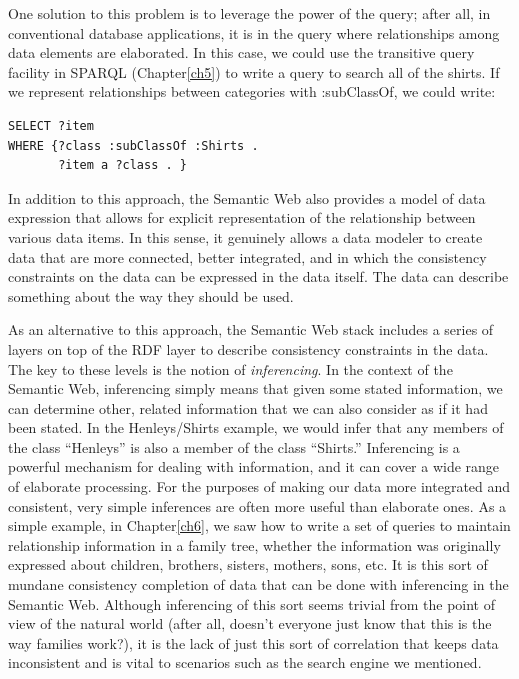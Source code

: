 One solution to this problem is to leverage the power of the query;
after all, in conventional database applications, it is in the query
where relationships among data elements are elaborated. In this case, we
could use the transitive query facility in SPARQL (Chapter\ref{ch5}) to write a
query to search all of the shirts. If we represent relationships between
categories with :subClassOf, we could write:

\begin{lstlisting}
SELECT ?item
WHERE {?class :subClassOf :Shirts .
       ?item a ?class . }
\end{lstlisting}


In addition to this approach, the Semantic Web also provides a model of
data expression that allows for explicit representation of the
relationship between various data items. In this sense, it genuinely
allows a data modeler to create data that are more connected, better
integrated, and in which the consistency constraints on the data can be
expressed in the data itself. The data can describe something about the
way they should be used.

As an alternative to this approach, the Semantic Web stack includes a
series of layers on top of the RDF layer to describe consistency
constraints in the data. The key to these levels is the notion of
\emph{inferencing}. In the context of the Semantic Web, inferencing
simply means that given some stated information, we can determine other,
related information that we can also consider as if it had been stated.
In the Henleys/Shirts example, we would infer that any members of the
class ``Henleys'' is also a member of the class ``Shirts.'' Inferencing
is a powerful mechanism for dealing with information, and it can cover a
wide range of elaborate processing. For the purposes of making our data
more integrated and consistent, very simple inferences are often more
useful than elaborate ones. As a simple example, in Chapter\ref{ch6}, we saw
how to write a set of queries to maintain relationship information in a
family tree, whether the information was originally expressed about
children, brothers, sisters, mothers, sons, etc. It is this sort of
mundane consistency completion of data that can be done with inferencing
in the Semantic Web. Although inferencing of this sort seems trivial
from the point of view of the natural world (after all, doesn't everyone
just know that this is the way families work?), it is the lack of just
this sort of correlation that keeps data inconsistent and is vital to
scenarios such as the search engine we mentioned.

